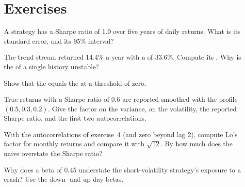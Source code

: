 \section{Exercises}

\begin{exercise}[$\star$]\label{exo:rs:performance-measurement:1}
A strategy has a Sharpe ratio of 1.0 over five years of daily returns. What is its standard error, and its 95\% interval?
\end{exercise}

\begin{exercise}[$\star$]\label{exo:rs:performance-measurement:2}
The trend stream returned 14.4\% a year with a  of 33.6\%. Compute its . Why is the  of a single history unstable?
\end{exercise}

\begin{exercise}[$\star$]\label{exo:rs:performance-measurement:3}
Show that the  equals the  at a threshold of zero.
\end{exercise}

\begin{exercise}[$\star\star$]\label{exo:rs:performance-measurement:4}
True returns with a Sharpe ratio of 0.6 are reported smoothed with the profile $(0.5, 0.3, 0.2)$. Give the factor on the variance, on the volatility, the reported
Sharpe ratio, and the first two autocorrelations.
\end{exercise}

\begin{exercise}[$\star\star$]\label{exo:rs:performance-measurement:5}
With the autocorrelations of exercise~4 (and zero beyond lag 2), compute Lo's  factor for monthly returns and compare it with $\sqrt{12}$. By how
much does the naive  overstate the Sharpe ratio?
\end{exercise}

\begin{exercise}[$\star\star$]\label{exo:rs:performance-measurement:6}
Why does a beta of 0.45 understate the short-volatility strategy's exposure to a crash? Use the down- and up-day betas.
\end{exercise}

